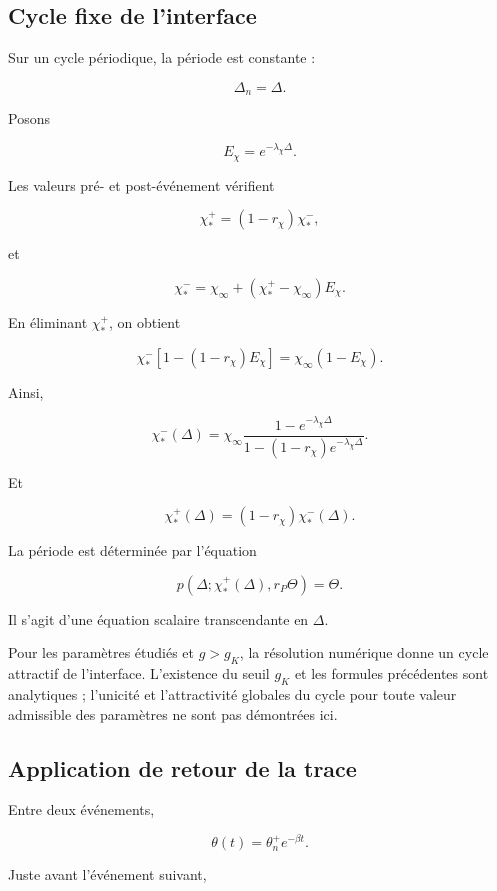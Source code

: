 \subsection{Cycle fixe de l'interface}
\label{annexe-r2-cycle-fixe}

Sur un cycle périodique, la période est constante :

\[
\Delta_n=\Delta.
\]

Posons

\[
E_\chi
=
e^{-\lambda_\chi\Delta}.
\]

Les valeurs pré- et post-événement vérifient

\[
\chi_\ast^+
=
(1-r_\chi)\chi_\ast^-,
\]

et

\[
\chi_\ast^-
=
\chi_\infty
+
\left(
\chi_\ast^+-\chi_\infty
\right)E_\chi.
\]

En éliminant \(\chi_\ast^+\), on obtient

\[
\chi_\ast^-
\left[
1-(1-r_\chi)E_\chi
\right]
=
\chi_\infty
\left(
1-E_\chi
\right).
\]

Ainsi,

\[
\boxed{
\chi_\ast^-(\Delta)
=
\chi_\infty
\frac{
1-e^{-\lambda_\chi\Delta}
}{
1-(1-r_\chi)e^{-\lambda_\chi\Delta}
}.
}
\]

Et

\[
\boxed{
\chi_\ast^+(\Delta)
=
(1-r_\chi)\chi_\ast^-(\Delta).
}
\]

La période est déterminée par l'équation

\[
\boxed{
p
\left(
\Delta;
\chi_\ast^+(\Delta),
r_P\Theta
\right)
=
\Theta.
}
\]

Il s'agit d'une équation scalaire transcendante en \(\Delta\).

Pour les paramètres étudiés et \(g>g_K\), la résolution numérique
donne un cycle attractif de l'interface. L'existence du seuil \(g_K\)
et les formules précédentes sont analytiques ; l'unicité et
l'attractivité globales du cycle pour toute valeur admissible des
paramètres ne sont pas démontrées ici.

\subsection{Application de retour de la trace}
\label{annexe-r2-retour-trace}

Entre deux événements,

\[
\theta(t)
=
\theta_n^+e^{-\beta t}.
\]

Juste avant l'événement suivant,

